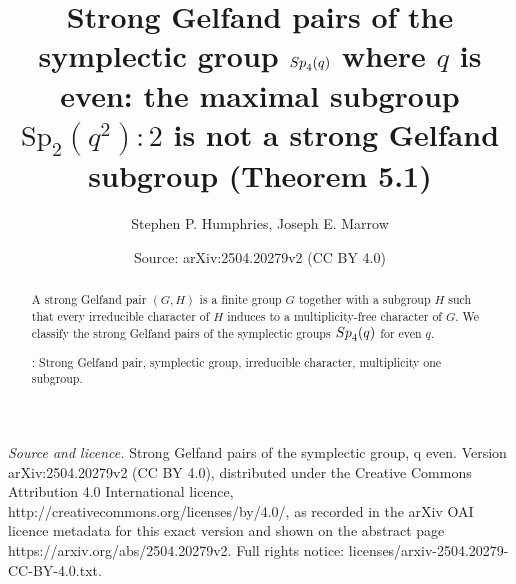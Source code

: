 \documentclass[10pt,a4paper]{amsart}
\title[Strong Gelfand pairs of the symplectic group ${\rm Sp}_4(q)$, $q$ even]{Strong Gelfand pairs of the symplectic group ${\rm Sp}_4(q)$ where $q$ is even: the maximal subgroup $\mathrm{Sp}_2(q^2)\colon 2$ is not a strong Gelfand subgroup (Theorem 5.1)}
\author{Stephen P. Humphries, Joseph E. Marrow}
\date{Source: arXiv:2504.20279v2 (CC BY 4.0)}
\theoremstyle{plain}
\theoremstyle{definition}
\numberwithin{equation}{section}
\begin{document}
\begin{abstract}
A strong Gelfand pair $(G,H)$ is a finite group $G$ together with a subgroup $H$ such that every irreducible character of $H$ induces to  a multiplicity-free character of $G$.  We classify the strong Gelfand pairs of the symplectic  groups
${\rm Sp}_4(q)$ for even $q$.


\medskip

: Strong Gelfand pair, symplectic group, irreducible character, multiplicity one subgroup. \newline 
\medskip
{}
\end{abstract}
\maketitle
\noindent\emph{Source and licence.} Strong Gelfand pairs of the symplectic group, q even. Version arXiv:2504.20279v2 (CC BY 4.0), distributed under the Creative Commons Attribution 4.0 International licence, http://creativecommons.org/licenses/by/4.0/, as recorded in the arXiv OAI licence metadata for this exact version and shown on the abstract page https://arxiv.org/abs/2504.20279v2. Full rights notice: licenses/arxiv-2504.20279-CC-BY-4.0.txt.\par\smallskip
\end{document}
